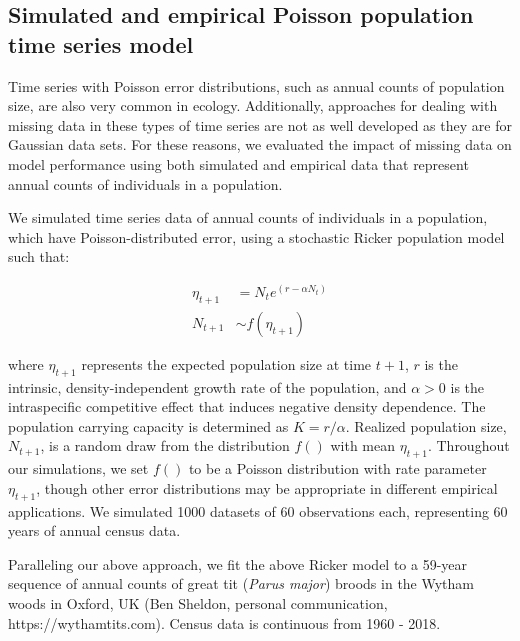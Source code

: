 \documentclass{article}
\begin{document}
\begin{linenumbers}
\subsection*{Simulated and empirical Poisson population time series model}

Time series with Poisson error distributions, such as annual counts of population size, are also very common in ecology. Additionally, approaches for dealing with missing data in these types of time series are not as well developed as they are for Gaussian data sets. For these reasons, we evaluated the impact of missing data on model performance using both simulated and empirical data that represent annual counts of individuals in a population. 

We simulated time series data of annual counts of individuals in a population, which have Poisson-distributed error, using a stochastic Ricker population model \citep{ricker1954stock} such that:


\begin{subequations}
\begin{align} \label{eq:ricker2}
    \eta_{t+1} &= N_t e^{(r - \alpha N_t)}\\
    N_{t+1} &\sim f(\eta_{t+1})
\end{align}
\end{subequations}

\noindent where \(\eta_{t+1}\) represents the expected population size at time \(t+1\), \(r\) is the intrinsic, density-independent growth rate of the population, and $\alpha > 0$ is the intraspecific competitive effect that induces negative density dependence. The population carrying capacity is determined as $K= r/\alpha$. Realized population size, $N_{t+1}$, is a random draw from the distribution $f()$ with mean $\eta_{t+1}$. Throughout our simulations, we set $f()$ to be a Poisson distribution with rate parameter $\eta_{t+1}$, though other error distributions may be appropriate in different empirical applications. We simulated 1000 datasets of 60 observations each, representing 60 years of annual census data. 

Paralleling our above approach, we fit the above Ricker model to a 59-year sequence of annual counts of great tit (\textit{Parus major}) broods in the Wytham woods in Oxford, UK (Ben Sheldon, personal communication, https://wythamtits.com). Census data is continuous from 1960 - 2018. 


\end{linenumbers}
\end{document}
